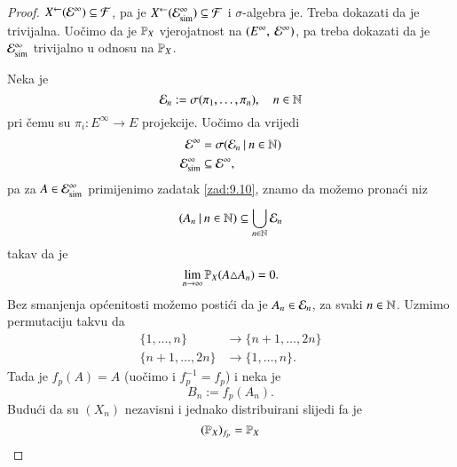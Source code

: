 \begin{proof}
    ${X}^{\leftarrow} (\mathcal{E}^\infty) \subseteq \mathcal{F}$, pa je ${X}^{\leftarrow} (\mathcal{E}_{\mathrm{sim}}^\infty) \subseteq \mathcal{F}$ i $\sigma$-algebra je.
    Treba dokazati da je trivijalna.
    Uo\v cimo da je $\mathbb{P}_X$ vjerojatnost na $({E^\infty}, \: {\mathcal{E}^\infty})$, pa treba dokazati da je $\mathcal{E}_{\mathrm{sim}}^\infty$ trivijalno u odnosu na $\mathbb{P}_X$.

    Neka je
    \begin{equation*}
        \mathcal{E}_n := \sigma({\pi_1, \ldots, \pi_n}), \quad n \in \mathbb{N}    
    \end{equation*}
    pri \v cemu su $\pi_i : E^\infty \to E$ projekcije.
    Uo\v cimo da vrijedi
    \begin{equation*}
        \begin{aligned}
            \mathcal{E}^\infty &= \sigma({\mathcal{E}_n} \: | \: {n \in \mathbb{N}})\\
            \mathcal{E}_{\mathrm{sim}}^\infty &\subseteq \mathcal{E}^\infty,
        \end{aligned}
    \end{equation*}
    pa za $A \in \mathcal{E}_{\mathrm{sim}}^\infty$ primijenimo zadatak \ref{zad:9.10}, znamo da mo\v zemo prona\' ci niz
    \begin{equation*}
        ({A_n} \: | \: {n \in \mathbb{N}}) \subseteq \bigcup\limits_{n \in \mathbb{N}}^{} \mathcal{E}_n
    \end{equation*}
    takav da je
    \begin{equation*}
        \lim\limits_{n \to \infty} \mathbb{P}_X (A \triangle A_n) = 0.
    \end{equation*}
    Bez smanjenja op\' cenitosti mo\v zemo posti\' ci da je $A_n \in \mathcal{E}_n$, za svaki $n \in \mathbb{N}$.
    Uzmimo permutaciju takvu da
    \begin{equation*}
        \begin{aligned}
            \{1, \ldots, n\} &\to \{n+1, \ldots, 2n\}\\
            \{n+1, \ldots, 2n\} &\to \{1, \ldots, n\}.
        \end{aligned}
    \end{equation*}
    Tada je $f_p(A) = A$ (uo\v cimo i $f_p^{-1} = f_p$) i neka je
    \begin{equation*}
        B_n := f_p (A_n).
    \end{equation*}
    Budu\' ci da su $(X_n)$ nezavisni i jednako distribuirani slijedi fa je
    \begin{equation*}
        (\mathbb{P}_X)_{f_p} = \mathbb{P}_X    
    \end{equation*}

\end{proof}
